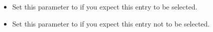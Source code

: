 
\begin{itemize}
\item Set this parameter to  if you expect this entry to be selected. 
\item Set this parameter to  if you expect this entry not to be selected. 
\end{itemize}
